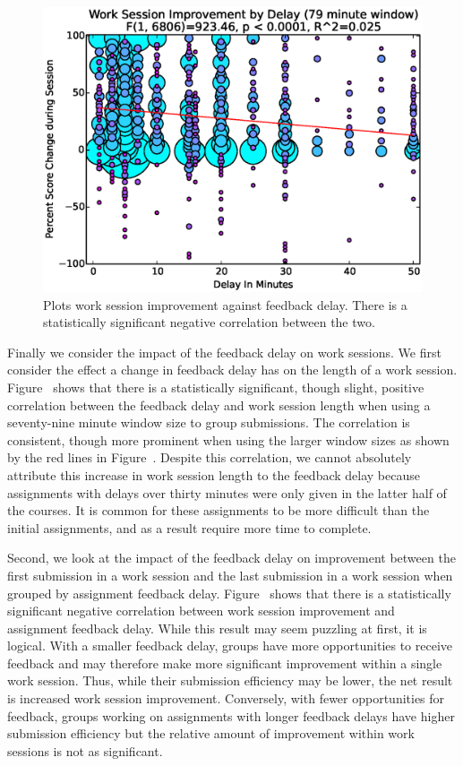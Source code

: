 \begin{figure}[!t]
\centering
\includegraphics[width=5.25in]{graphs/Work_Session_Improvement_by_Delay_(79_minute_window).eps}
\caption{Plots work session improvement against feedback delay. There is a
  statistically significant negative correlation between the two.}
\end{figure}

Finally we consider the impact of the feedback delay on work sessions. We first
consider the effect a change in feedback delay has on the length of a work
session. Figure~ shows that there is a
statistically significant, though slight, positive correlation between the
feedback delay and work session length when using a seventy-nine minute window
size to group submissions. The correlation is consistent, though more prominent
when using the larger window sizes as shown by the red lines in
Figure~. Despite this correlation, we cannot
absolutely attribute this increase in work session length to the feedback delay
because assignments with delays over thirty minutes were only given in the
latter half of the courses. It is common for these assignments to be more
difficult than the initial assignments, and as a result require more time to
complete.

Second, we look at the impact of the feedback delay on improvement between the
first submission in a work session and the last submission in a work session
when grouped by assignment feedback
delay. Figure~ shows that there is a
statistically significant negative correlation between work session improvement
and assignment feedback delay. While this result may seem puzzling at first, it
is logical. With a smaller feedback delay, groups have more opportunities to
receive feedback and may therefore make more significant improvement within a
single work session. Thus, while their submission efficiency may be lower, the
net result is increased work session improvement. Conversely, with fewer
opportunities for feedback, groups working on assignments with longer feedback
delays have higher submission efficiency but the relative amount of improvement
within work sessions is not as significant.
